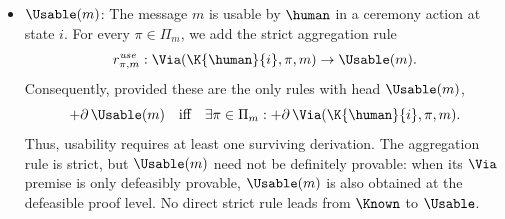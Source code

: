 \begin{itemize}
        \item $\Usable(m)$: The message $m$ is usable by $\human$ in a ceremony action at state $i$. For every $\pi\in\Pi_m$, we add the strict aggregation rule 
        \[
        r^{\mathit{use}}_{\pi,m}: \Via(\K{\human}{i},\pi,m) \to \Usable(m).
        \]
        Consequently, provided these are the only rules with head $\Usable(m)$,
        \[
        +\partial\,\Usable(m) \quad\text{iff}\quad \exists\pi\in\Pi_m: +\partial\,\Via(\K{\human}{i},\pi,m).
        \]
        Thus, usability requires at least one surviving derivation. The aggregation rule is strict, but $\Usable(m)$ need not be definitely provable: when its $\Via$ premise is only defeasibly provable, $\Usable(m)$ is also obtained at the defeasible proof level. No direct strict rule leads from $\Known$ to $\Usable$.
\end{itemize}

